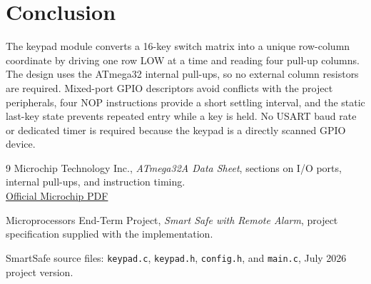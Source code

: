 \documentclass[11pt,a4paper]{article}
\begin{document}
\section{Conclusion}
The keypad module converts a 16-key switch matrix into a unique row-column coordinate by driving one row LOW at a time and reading four pull-up columns. The design uses the ATmega32 internal pull-ups, so no external column resistors are required. Mixed-port GPIO descriptors avoid conflicts with the project peripherals, four NOP instructions provide a short settling interval, and the static last-key state prevents repeated entry while a key is held. No USART baud rate or dedicated timer is required because the keypad is a directly scanned GPIO device.

\begin{thebibliography}{9}
Microchip Technology Inc., \emph{ATmega32A Data Sheet}, sections on I/O ports, internal pull-ups, and instruction timing.\\
\href{https://ww1.microchip.com/downloads/en/DeviceDoc/Atmega32A-Data-Sheet-DS40002072A.pdf}{Official Microchip PDF}

Microprocessors End-Term Project, \emph{Smart Safe with Remote Alarm}, project specification supplied with the implementation.

SmartSafe source files: \texttt{keypad.c}, \texttt{keypad.h}, \texttt{config.h}, and \texttt{main.c}, July 2026 project version.
\end{thebibliography}
\end{document}
